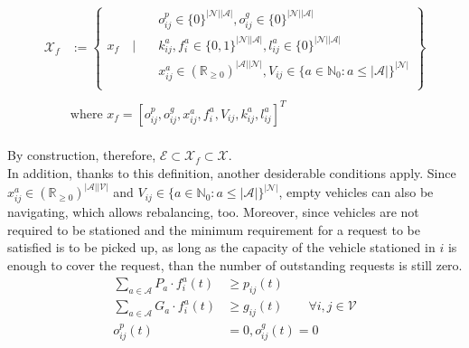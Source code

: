\begin{equation}
	\begin{aligned}
	\mathcal{X}_f &:= \left\{
	\begin{aligned}
		& o^p_{ij} \in \{0\}^{|\mathcal{N}||\mathcal{A}|} , o^g_{ij} \in \{0\}^{|\mathcal{N}||\mathcal{A}|}  \\
		x_f \quad \Bigg| \quad &k^a_{ij},f^a_{i} \in \{0,1\}^{|\mathcal{N}||\mathcal{A}|},  l^a_{ij}\in \{0\}^{|\mathcal{N}||\mathcal{A}|}\\%
		&  x_{ij}^a\in (\mathbb{R}_{\ge 0})^{|\mathcal{A}||\mathcal{N}|}, V_{ij} \in \{ a \in \mathbb{N}_0: a \leq |\mathcal{A}| \}^{|\mathcal{N}|}\\%
	\end{aligned}
	\right\}\\
	&\\
	&\text{where }  x_f = [o^p_{ij},o^g_{ij}, x_{ij}^a, f^a_{i}, V_{ij} , k^a_{ij}, l^a_{ij}]^T
	\end{aligned}
	\label{eq:final_x_f}
\end{equation}\\
By construction, therefore, $\mathcal{E} \subset \mathcal{X}_f \subset \mathcal{X}$. \\
In addition, thanks to this definition, another desiderable conditions apply. Since $ x_{ij}^a\in (\mathbb{R}_{\ge 0})^{|\mathcal{A}||\mathcal{V}|}$ and $V_{ij} \in \{ a \in \mathbb{N}_0 : a \leq |\mathcal{A}| \}^{|\mathcal{N}|}$, empty vehicles can also be navigating, which allows rebalancing, too. Moreover, since vehicles are not required to be stationed and the minimum requirement for a request to be satisfied is to be picked up, as long as the capacity of the vehicle stationed in $i$ is enough to cover the request, than the number of outstanding requests is still zero. 
\begin{equation}
\begin{aligned}
	\sum_{a \in \mathcal{A}}  P_a\cdot f^a_{i}(t) &\ge p_{ij}(t) \\
	\sum_{a \in \mathcal{A}} G_a \cdot f^a_{i}(t) &\ge  g_{ij}(t) \quad\quad \forall i,j\in\mathcal{V}\\
	o^p_{ij}(t) &=0, o^g_{ij}(t) =0\\
\end{aligned}
\label{eq:conserved_rela}
\end{equation}
